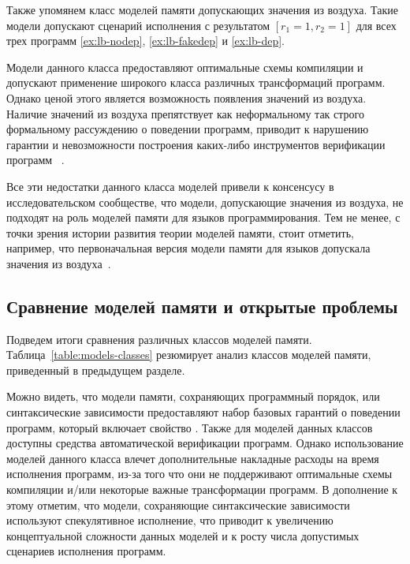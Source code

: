 Также упомянем класс моделей памяти допускающих значения из воздуха.
Такие модели допускают сценарий исполнения с результатом ${[r_1=1,r_2=1]}$
для всех трех программ \ref{ex:lb-nodep}, \ref{ex:lb-fakedep} и \ref{ex:lb-dep}.

Модели данного класса предоставляют оптимальные схемы компиляции и
допускают применение широкого класса различных трансформаций программ.
Однако ценой этого является возможность появления значений из воздуха.
Наличие значений из воздуха препятствует как неформальному
так строго формальному рассуждению о поведении программ,
приводит к нарушению гарантии \DRF и невозможности
построения каких-либо инструментов верификации программ%
~\cite{Boehm-Demsky:MSPC14, Batty-al:ESOP15}. 

Все эти недостатки данного класса моделей
привели к консенсусу в исследовательском сообществе,
что модели, допускающие значения из воздуха,
не подходят на роль моделей памяти 
для языков программирования.
Тем не менее, с точки зрения истории развития
теории моделей памяти, стоит отметить, например,
что первоначальная версия модели памяти для языков \CPP
допускала значения из воздуха~\cite{Batty-al:POPL11}.

\subsection{Сравнение моделей памяти и открытые проблемы}
\label{sec:models-summary}

Подведем итоги сравнения различных классов моделей памяти. 
Таблица~\ref{table:models-classes} резюмирует 
анализ классов моделей памяти, приведенный в 
предыдущем разделе.



Можно видеть, что модели памяти,
сохраняющих программный порядок, или синтаксические зависимости 
предоставляют набор базовых гарантий о поведении программ, 
который включает свойство \DRF. Также для моделей данных классов 
доступны средства автоматической верификации программ.
Однако использование моделей данного класса влечет 
дополнительные накладные расходы на время исполнения программ, 
из-за того что они не поддерживают оптимальные схемы компиляции
и/или некоторые важные трансформации программ.
В дополнение к этому отметим, что модели,
сохраняющие синтаксические зависимости используют спекулятивное исполнение, 
что приводит к увеличению концептуальной сложности данных моделей 
и к росту числа допустимых сценариев исполнения программ. 

